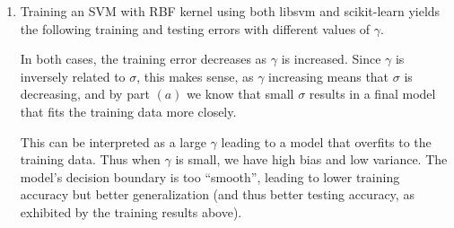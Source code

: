 \documentclass{article}
\begin{document}
\begin{enumerate}
	\item Training an SVM with RBF kernel using both libsvm and scikit-learn yields the following training and testing errors with different values of $\gamma$.
\begin{figure}[H]
	\centering
\end{figure}
In both cases, the training error decreases as $\gamma$ is increased. Since $\gamma$ is inversely related to $\sigma$, this makes sense, as $\gamma$ increasing means that $\sigma$ is decreasing, and by part $(a)$ we know that small $\sigma$ results in a final model that fits the training data more closely.

This can be interpreted as a large $\gamma$ leading to a model that overfits to the training data. Thus when $\gamma$ is small, we have high bias and low variance. The model's decision boundary is too ``smooth'', leading to lower training accuracy but better generalization (and thus better testing accuracy, as exhibited by the training results above).
		

\end{enumerate}
\end{document}
